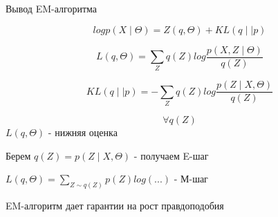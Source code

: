 \documentclass[a4paper, 12pt]{article}
\begin{document}
Вывод EM-алгоритма

\[log p(X \mid \Theta) = Z(q, \Theta) + KL(q \mid \mid p)\]

\[L(q, \Theta) = \sum_{Z} q(Z)log \frac{p(X, Z \mid \Theta)}{q(Z)}\]

\[KL(q \mid \mid p) = -\sum_{Z} q(Z)log \frac{p(Z \mid X, \Theta)}{q(Z)}\]

\[\forall q(Z)\]
\(L(q, \Theta)\) - нижняя оценка

Берем \(q(Z) = p(Z \mid X, \Theta)\) - получаем E-шаг

\(L(q, \Theta) = \sum_{Z \sim q(Z)} p(Z) log(...)\) - М-шаг

EM-алгоритм дает гарантии на рост правдоподобия
\end{document}
